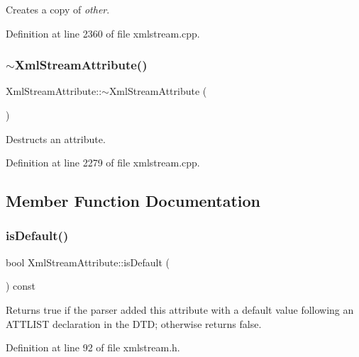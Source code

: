 Creates a copy of {\itshape other}. 

Definition at line 2360 of file xmlstream.\+cpp.

\mbox{\label{class_xml_stream_attribute_a0790a80f54d9bb1dba7ce5f230ff3b61}} 
\subsubsection{\texorpdfstring{$\sim$\+Xml\+Stream\+Attribute()}{~XmlStreamAttribute()}}
{\footnotesize\ttfamily Xml\+Stream\+Attribute\+::$\sim$\+Xml\+Stream\+Attribute (\begin{DoxyParamCaption}{ }\end{DoxyParamCaption})}

Destructs an attribute. 

Definition at line 2279 of file xmlstream.\+cpp.



\subsection{Member Function Documentation}
\mbox{\label{class_xml_stream_attribute_ab2798a63f4ca2dd71004602f94bddc53}} 
\subsubsection{\texorpdfstring{is\+Default()}{isDefault()}}
{\footnotesize\ttfamily bool Xml\+Stream\+Attribute\+::is\+Default (\begin{DoxyParamCaption}{ }\end{DoxyParamCaption}) const\hspace{0.3cm}{\ttfamily [inline]}}

Returns {\ttfamily true} if the parser added this attribute with a default value following an A\+T\+T\+L\+I\+ST declaration in the D\+TD; otherwise returns {\ttfamily false}. 

Definition at line 92 of file xmlstream.\+h.

